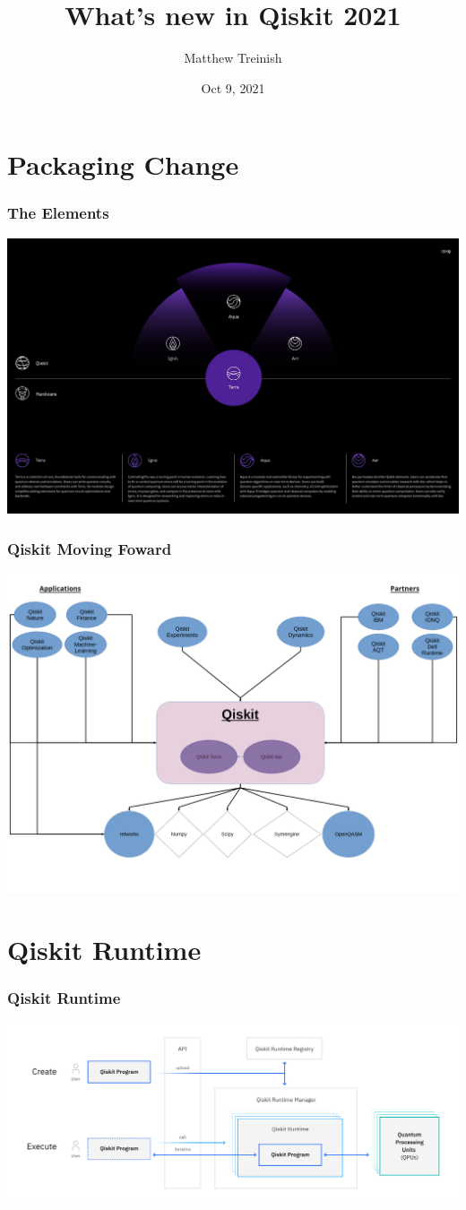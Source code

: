 \documentclass[aspectratio=169,11pt,hyperref={colorlinks=true}]{beamer}
\author[Matthew Treinish]{%
    \texorpdfstring{%
        \centering
        Matthew Treinish\\
   }
   {Matthew Treinish}
}
\date{Oct 9, 2021}
\title{What's new in Qiskit 2021}
\begin{document}
\titlepage

\section{Packaging Change}
\begin{frame}
    \frametitle{The Elements}
    \centering
    \includegraphics[width=.99\textwidth]{qiskit-components.jpeg}
\end{frame}

\begin{frame}
    \frametitle{Qiskit Moving Foward}
    \centering
    \includegraphics[width=.9\textwidth]{new_qiskit.png}
\end{frame}

\section{Qiskit Runtime}
\begin{frame}
    \frametitle{Qiskit Runtime}
    \centering
    \includegraphics[width=.99\textwidth]{qiskit-runtime.png}
\end{frame}
\end{document}
